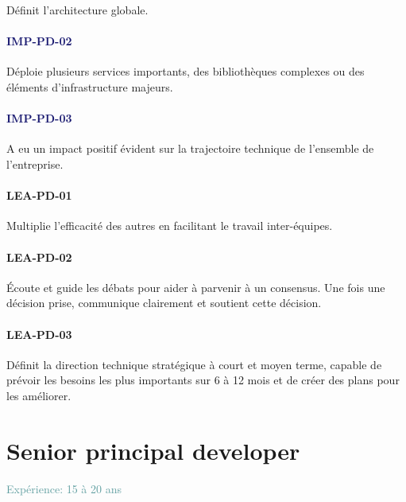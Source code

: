 \documentclass[a4paper, french, openany, 12pt]{book}
\newcommand\wis[1]{\textcolor{MidnightBlue}{\textbf{\uppercase{imp-{#1}}}}}
\newcommand\cha[1]{\textcolor{OliveGreen}{\textbf{\uppercase{lea-{#1}}}}}
\newcommand\xp[1]{\textcolor{CadetBlue}{Expérience: {#1} ans}}
\begin{document}
\begin{multicols}{2}
  Définit l'architecture globale.

  \subsubsection*{\wis{pd-02}}

  Déploie plusieurs services importants, des bibliothèques complexes ou des éléments d'infrastructure majeurs.

  \subsubsection*{\wis{pd-03}}

  A eu un impact positif évident sur la trajectoire technique de l'ensemble de l'entreprise.

  \subsubsection*{\cha{pd-01}}

  Multiplie l'efficacité des autres en facilitant le travail inter-équipes.

  \subsubsection*{\cha{pd-02}}

  Écoute et guide les débats pour aider à parvenir à un consensus.
  Une fois une décision prise, communique clairement et soutient cette décision.

  \subsubsection*{\cha{pd-03}}

  Définit la direction technique stratégique à court et moyen terme, capable de prévoir les besoins les plus importants 
  sur 6 à 12 mois et de créer des plans pour les améliorer.

\end{multicols}

\chapter{Senior principal developer}

\xp{15 à 20}
\end{document}
